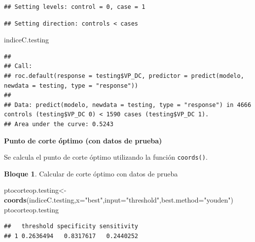 \documentclass[]{book}
\newenvironment{Shaded}{\begin{snugshade}}{\end{snugshade}}
\newcommand{\DataTypeTok}[1]{\textcolor[rgb]{0.13,0.29,0.53}{#1}}
\newcommand{\KeywordTok}[1]{\textcolor[rgb]{0.13,0.29,0.53}{\textbf{#1}}}
\newcommand{\NormalTok}[1]{#1}
\newcommand{\OperatorTok}[1]{\textcolor[rgb]{0.81,0.36,0.00}{\textbf{#1}}}
\newcommand{\StringTok}[1]{\textcolor[rgb]{0.31,0.60,0.02}{#1}}
\theoremstyle{definition}
\theoremstyle{definition}
\newtheorem{example}{Bloque}[chapter]
\theoremstyle{definition}
\theoremstyle{definition}
\theoremstyle{remark}
\begin{document}
\begin{verbatim}
## Setting levels: control = 0, case = 1
\end{verbatim}

\begin{verbatim}
## Setting direction: controls < cases
\end{verbatim}

\begin{Shaded}
\begin{Highlighting}[]
\NormalTok{indiceC.testing}
\end{Highlighting}
\end{Shaded}

\begin{verbatim}
## 
## Call:
## roc.default(response = testing$VP_DC, predictor = predict(modelo,     newdata = testing, type = "response"))
## 
## Data: predict(modelo, newdata = testing, type = "response") in 4666 controls (testing$VP_DC 0) < 1590 cases (testing$VP_DC 1).
## Area under the curve: 0.5243
\end{verbatim}

\textbf{Punto de corte óptimo (con datos de prueba)}

Se calcula el punto de corte óptimo utilizando la función \texttt{coords()}.

\begin{example}
\protect\hypertarget{exm:bloque88nbm}{}{\label{exm:bloque88nbm} }Calcular de corte óptimo con datos de prueba
\end{example}

\begin{Shaded}
\begin{Highlighting}[]
\NormalTok{ptocorteop.testing<-}\KeywordTok{coords}\NormalTok{(indiceC.testing,}\DataTypeTok{x=}\StringTok{"best"}\NormalTok{,}\DataTypeTok{input=}\StringTok{"threshold"}\NormalTok{,}\DataTypeTok{best.method=}\StringTok{"youden"}\NormalTok{)}
\NormalTok{ptocorteop.testing}
\end{Highlighting}
\end{Shaded}

\begin{verbatim}
##   threshold specificity sensitivity
## 1 0.2636494   0.8317617   0.2440252
\end{verbatim}

\begin{Shaded}
\end{Shaded}
\end{document}
